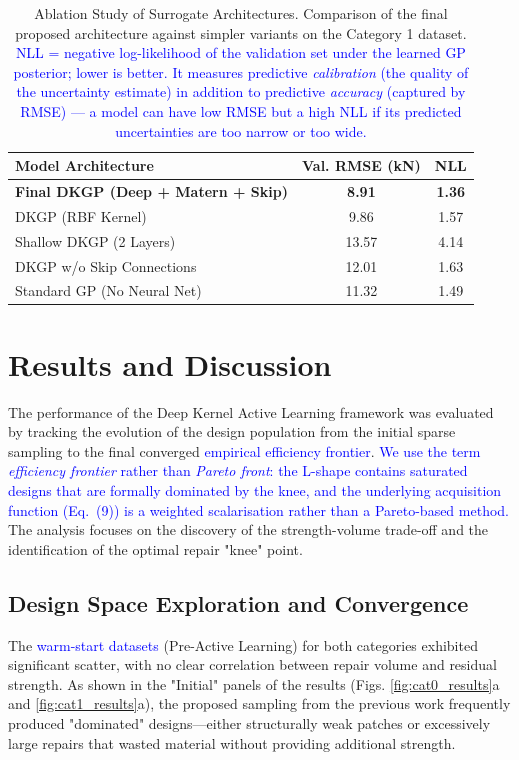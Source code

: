 \documentclass[
  preprint,
  12pt,
  a4paper
]{elsarticle}
\newcommand{\new}[1]{\textcolor{blue}{#1}}
\begin{document}
\begin{table}[htbp]
    \centering
    \caption{Ablation Study of Surrogate Architectures. Comparison of the final proposed architecture against simpler variants on the Category 1 dataset. \new{NLL = negative log-likelihood of the validation set under the learned GP posterior; lower is better. It measures predictive \emph{calibration} (the quality of the uncertainty estimate) in addition to predictive \emph{accuracy} (captured by RMSE) --- a model can have low RMSE but a high NLL if its predicted uncertainties are too narrow or too wide.}}
    \label{tab:ablation}
    \begin{tabular}{l c c}
        \toprule
        \textbf{Model Architecture} & \textbf{Val. RMSE (kN)} & \textbf{NLL} \\
        \midrule
        \textbf{Final DKGP (Deep + Matern + Skip)} & \textbf{8.91} & \textbf{1.36} \\
        DKGP (RBF Kernel) & 9.86 & 1.57 \\
        Shallow DKGP (2 Layers) & 13.57 & 4.14 \\
        DKGP w/o Skip Connections & 12.01 & 1.63 \\
        Standard GP (No Neural Net) & 11.32 & 1.49 \\
        \bottomrule
    \end{tabular}
\end{table}

\section{Results and Discussion}
\label{sec:results}

The performance of the Deep Kernel Active Learning framework was evaluated by tracking the evolution of the design population from the initial sparse sampling to the final converged \new{empirical efficiency frontier}. \new{We use the term \emph{efficiency frontier} rather than \emph{Pareto front}: the L-shape contains saturated designs that are formally dominated by the knee, and the underlying acquisition function (Eq.~(9)) is a weighted scalarisation rather than a Pareto-based method.} The analysis focuses on the discovery of the strength-volume trade-off and the identification of the optimal repair "knee" point.

\subsection{Design Space Exploration and Convergence}
The \new{warm-start datasets} (Pre-Active Learning) for both categories exhibited significant scatter, with no clear correlation between repair volume and residual strength. As shown in the "Initial" panels of the results (Figs. \ref{fig:cat0_results}a and \ref{fig:cat1_results}a), the proposed sampling from the previous work frequently produced "dominated" designs—either structurally weak patches or excessively large repairs that wasted material without providing additional strength.
\end{document}
